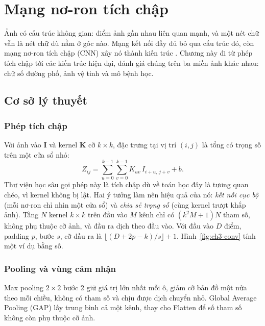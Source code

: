 \chapter{Mạng nơ-ron tích chập}
\label{chap:cnn}

Ảnh có cấu trúc không gian: điểm ảnh gần nhau liên quan mạnh, và một nét chữ vẫn là nét chữ dù nằm ở góc nào. Mạng kết nối đầy đủ bỏ qua cấu trúc đó, còn mạng nơ-ron tích chập (CNN) xây nó thành kiến trúc \cite{ch3-lecun1998}. Chương này đi từ phép tích chập tới các kiến trúc hiện đại, đánh giá chúng trên ba miền ảnh khác nhau: chữ số đường phố, ảnh vệ tinh và mô bệnh học.

\section{Cơ sở lý thuyết}

\subsection{Phép tích chập}
Với ảnh vào $\mathbf{I}$ và kernel $\mathbf{K}$ cỡ $k{\times}k$, đặc trưng tại vị trí $(i,j)$ là tổng có trọng số trên một cửa sổ nhỏ:
\begin{equation}
  Z_{ij}=\sum_{u=0}^{k-1}\sum_{v=0}^{k-1}K_{uv}\,I_{i+u,\,j+v}+b .
\end{equation}
Thư viện học sâu gọi phép này là tích chập dù về toán học đây là tương quan chéo, vì kernel không bị lật. Hai ý tưởng làm nên hiệu quả của nó: \emph{kết nối cục bộ} (mỗi nơ-ron chỉ nhìn một cửa sổ) và \emph{chia sẻ trọng số} (cùng kernel trượt khắp ảnh). Tầng $N$ kernel $k{\times}k$ trên đầu vào $M$ kênh chỉ có $(k^2M+1)N$ tham số, không phụ thuộc cỡ ảnh, và đầu ra dịch theo đầu vào. Với đầu vào $D$ điểm, padding $p$, bước $s$, cỡ đầu ra là $\lfloor(D+2p-k)/s\rfloor+1$. Hình~\ref{fig:ch3-conv} tính một ví dụ bằng số.


\subsection{Pooling và vùng cảm nhận}
Max pooling $2{\times}2$ bước 2 giữ giá trị lớn nhất mỗi ô, giảm cỡ bản đồ một nửa theo mỗi chiều, không có tham số và chịu được dịch chuyển nhỏ. Global Average Pooling (GAP) lấy trung bình cả một kênh, thay cho Flatten để số tham số không còn phụ thuộc cỡ ảnh.

